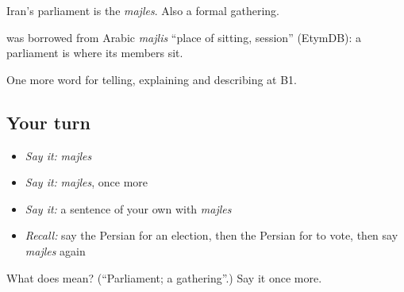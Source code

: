 Iran's parliament is the \emph{majles}. Also a formal gathering.

\begin{cousinweb}
\textbf{} was borrowed from Arabic \emph{majlis} \textquotedblleft{}place of sitting, session\textquotedblright{} (EtymDB): a parliament is where its members sit.
\end{cousinweb}

\begin{grammarlens}[title={What you've built}]
One more word for telling, explaining and describing at B1.
\end{grammarlens}

\subsection*{Your turn}
\begin{itemize}
\raggedright
  \item \emph{Say it:} \emph{majles}
  \item \emph{Say it:} \emph{majles}, once more
  \item \emph{Say it:} a sentence of your own with \emph{majles}
  \item \emph{Recall:} say the Persian for an election, then the Persian for to vote, then say \emph{majles} again
\end{itemize}

\begin{tcolorbox}[breakable,colback=teal!4,colframe=teal!35!black,title={Before you move on}]
What does  mean? (\textquotedblleft{}Parliament; a gathering\textquotedblright{}.) Say it once more.
\end{tcolorbox}
